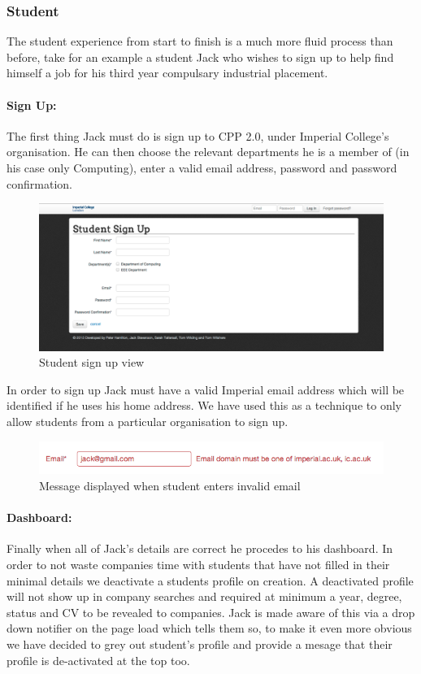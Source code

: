 \subsubsection{Student}
The student experience from start to finish is a much more fluid process than before, take for an example a student Jack who wishes to sign up to help find himself a job for his third year compulsary industrial placement.
  \paragraph{Sign Up:}
    The first thing Jack must do is sign up to CPP 2.0, under Imperial College's organisation. He can then choose the relevant departments he is a member of (in his case only Computing), enter a valid email address, password and password confirmation.

    \begin{figure}[H]\centering
    \includegraphics[scale=0.3]{images/user_experiences/student/sign_up_page}
    \caption{Student sign up view}
    \end{figure}

    In order to sign up Jack must have a valid Imperial email address which will be identified if he uses his home address. We have used this as a technique to only allow students from a particular organisation to sign up.

    \begin{figure}[H]\centering
    \includegraphics[scale=0.5]{images/user_experiences/student/invalid_email}
    \caption{Message displayed when student enters invalid email}
    \end{figure}

  \paragraph{Dashboard:}
    Finally when all of Jack's details are correct he procedes to his dashboard. In order to not waste companies time with students that have not filled in their minimal details we deactivate a students profile on creation. A deactivated profile will not show up in company searches and required at minimum a year, degree, status and CV to be revealed to companies. 
    Jack is made aware of this via a drop down notifier on the page load which tells them so, to make it even more obvious we have decided to grey out student's profile and provide a mesage that their profile is de-activated at the top too.


